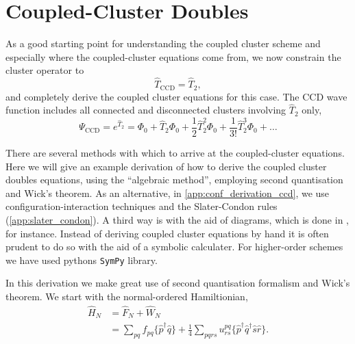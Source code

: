\section{Coupled-Cluster Doubles}

As a good starting point for understanding the coupled cluster scheme and especially
where the coupled-cluster equations come from, we now constrain the cluster
operator to
\begin{equation}
    \hat{T}_{\text{CCD}} = \hat{T}_2,
\end{equation}
and completely derive the coupled cluster equations for this case.
The CCD wave function includes all connected and disconnected clusters involving
$\hat{T}_2$ only,
\begin{equation}
    \Psi_{\text{CCD}} = e^{\hat{T}_2} = \Phi_0 + \hat{T}_2\Phi_0 + \frac{1}{2}\hat{T}_2^2\Phi_0 
        + \frac{1}{3!}\hat{T}_2^3\Phi_0 + \dots
\end{equation}

There are several methods with which to arrive at the coupled-cluster equations. 
Here we will give an example derivation of how to derive the coupled cluster doubles
equations, using the ``algebraic method'',
employing second quantisation and Wick's theorem. As an alternative,
in \autoref{app:conf_derivation_ccd}, we use
configuration-interaction techniques and the Slater-Condon rules (\autoref{app:slater_condon}).
A third way is with the aid of
diagrams, which is done in \citeauthor{shavitt2009many}\cite{shavitt2009many}, for instance.
Instead of deriving coupled cluster equations by hand it is often prudent to 
do so with the aid of a symbolic calculater. For higher-order schemes we have used pythons 
\lstinline{SymPy} library.

In this derivation we make great use of second quantisation formalism and Wick's 
theorem. We start with the normal-ordered Hamiltionian,
\begin{equation}
    \begin{aligned}
    \hat{H}_N &= \hat{F}_N  + \hat{W}_N \\
        &= \sum_{pq} f_{pq} \{ \hat{p}^\dagger \hat{q} \}
            + \frac{1}{4} \sum_{pqrs} u^{pq}_{rs} \{\hat{p}^\dagger\hat{q}^\dagger\hat{s}\hat{r}\}.
    \end{aligned}
\end{equation}

